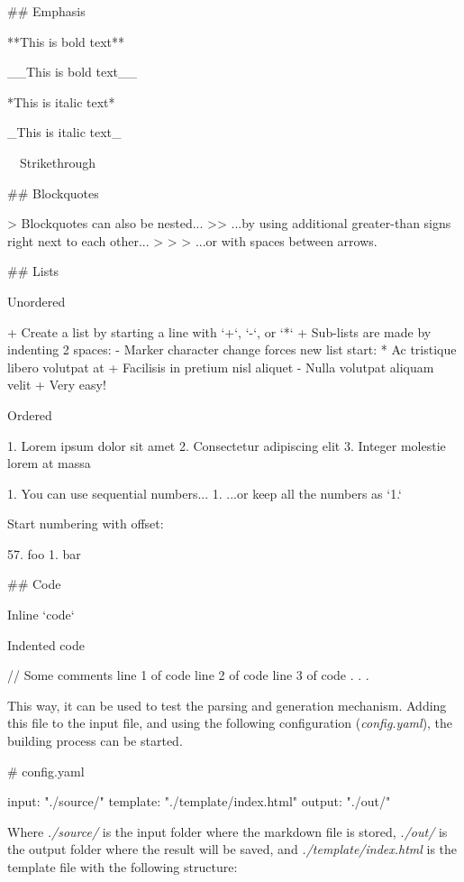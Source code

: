 \begin{code}

    ## Emphasis

    **This is bold text**

    __This is bold text__

    *This is italic text*

    _This is italic text_

    ~~Strikethrough~~


    ## Blockquotes


    > Blockquotes can also be nested...
    >> ...by using additional greater-than signs right next to each other...
    > > > ...or with spaces between arrows.


    ## Lists

    Unordered

    + Create a list by starting a line with `+`, `-`, or `*`
    + Sub-lists are made by indenting 2 spaces:
    - Marker character change forces new list start:
    * Ac tristique libero volutpat at
    + Facilisis in pretium nisl aliquet
    - Nulla volutpat aliquam velit
    + Very easy!

    Ordered

    1. Lorem ipsum dolor sit amet
    2. Consectetur adipiscing elit
    3. Integer molestie lorem at massa


    1. You can use sequential numbers...
    1. ...or keep all the numbers as `1.`

    Start numbering with offset:

    57. foo
    1. bar


    ## Code

    Inline `code`

    Indented code

    // Some comments
    line 1 of code
    line 2 of code
    line 3 of code
    .
    .
    .
\end{code}


This way, it can be used to test the parsing and generation mechanism.
Adding this file to the input file, and using the following configuration (\emph{config.yaml}), the building process
can be
started.

\begin{code}
    # config.yaml

    input: "./source/"
    template: "./template/index.html"
    output: "./out/"
\end{code}


Where \emph{./source/} is the input folder where the markdown file is stored, \emph{./out/} is the output folder
where the result will be saved, and \emph{./template/index.html} is the template file with the following structure:


